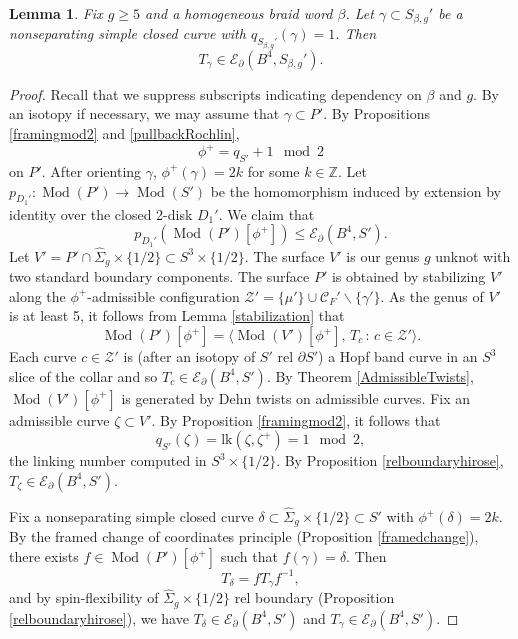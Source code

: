 \documentclass[10pt]{amsart}
\numberwithin{equation}{section}
\theoremstyle{plain}
\newtheorem{lemma}[theorem]{Lemma}
\theoremstyle{definition}
\theoremstyle{remark}
\DeclareMathOperator{\Mod}{Mod}
\begin{document}
\begin{lemma} \label{twistson1curves}
Fix $g \geq 5$ and a homogeneous braid word $\beta$. Let $\gamma \subset S_{\beta,g}'$ be a nonseparating simple closed curve  with $q_{S_{\beta,g}'}(\gamma) = 1$. Then  \[T_{\gamma} \in \mathcal{E}_{\partial}(B^4,S_{\beta,g}').\]    
\end{lemma}

\begin{proof}
Recall that we suppress subscripts indicating dependency on $\beta$ and $g$. By an isotopy if necessary, we may assume that $\gamma \subset P'$. By Propositions \ref{framingmod2} and \ref{pullbackRochlin}, \[\phi^+  = q_{S'}+1 \mod 2\] on $P'$. After orienting $\gamma$, $\phi^+(\gamma) = 2k$ for some $k \in \mathbb{Z}$. Let $p_{D_1'} : \Mod(P') \to \Mod(S')$ be the homomorphism induced by extension by identity over the closed 2-disk $D_1'$. We claim that \[p_{D_1'}(\Mod(P')[\phi^+]) \leq \mathcal{E}_{\partial}(B^4,S').\] Let $V' = P' \cap \widehat{\Sigma}_g \times \{1/2\} \subset S^3 \times \{1/2\}$. The surface $V'$ is our genus $g$ unknot with two standard boundary components. The surface $P'$ is obtained by stabilizing $V'$ along the $\phi^+$-admissible configuration $\mathcal{Z}' = \{\mu'\} \cup \mathcal{C}_{F}'\backslash\{\gamma'\}$. As the genus of $V'$ is at least 5, it follows from Lemma \ref{stabilization} that \[\Mod(P')[\phi^+] = \langle \Mod(V')[\phi^+], \,T_c \,:\, c \in \mathcal{Z}'\rangle.\] Each curve $c \in \mathcal{Z}'$ is (after an isotopy of $S'$ rel $\partial S'$) a Hopf band curve in an $S^3$ slice of the collar and so $T_c \in \mathcal{E}_\partial(B^4,S')$. By Theorem \ref{AdmissibleTwists}, $\Mod(V')[\phi^+]$ is generated by Dehn twists on admissible curves. Fix an admissible curve $\zeta \subset V'$. By Proposition \ref{framingmod2}, it follows that \[q_{S'}(\zeta) = \mathrm{lk}(\zeta,\zeta^+) = 1 \mod 2,\]the linking number computed in $S^3 \times \{1/2\}$. By Proposition \ref{relboundaryhirose}, $T_{\zeta} \in \mathcal{E}_{\partial}(B^4,S')$. 


Fix a nonseparating simple closed curve $\delta \subset \widehat{\Sigma}_g \times \{1/2\} \subset S'$ with $\phi^+(\delta)  = 2k$. By the framed change of coordinates principle (Proposition \ref{framedchange}), there exists $f \in \Mod(P')[\phi^+]$ such that $f(\gamma) = \delta$. Then \[T_{\delta} = fT_{\gamma}f^{-1},\] and by spin-flexibility of $\widehat{\Sigma}_g\times\{1/2\}$ rel boundary (Proposition \ref{relboundaryhirose}), we have $T_{\delta} \in \mathcal{E}_{\partial}(B^4,S')$ and  $T_{\gamma} \in \mathcal{E}_{\partial}(B^4,S')$. 
\end{proof}
\end{document}

